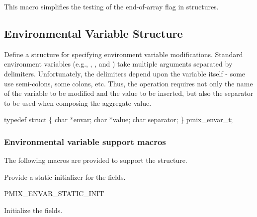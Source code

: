 This macro simplifies the testing of the end-of-array flag in  structures.

\subsection{Environmental Variable Structure}

Define a structure for specifying environment variable modifications.
Standard environment variables (e.g., , , and )
take multiple arguments separated by delimiters. Unfortunately, the delimiters
depend upon the variable itself - some use semi-colons, some colons, etc. Thus,
the operation requires not only the name of the variable to be modified and
the value to be inserted, but also the separator to be used when composing
the aggregate value.

\cspecificstart
\begin{codepar}
typedef struct \{
    char *envar;
    char *value;
    char separator;
\} pmix_envar_t;
\end{codepar}
\cspecificend

\subsubsection{Environmental variable support macros}

The following macros are provided to support the  structure.


Provide a static initializer for the  fields.

\cspecificstart
\begin{codepar}
PMIX_ENVAR_STATIC_INIT
\end{codepar}
\cspecificend



Initialize the  fields.


\begin{arglist}
\end{arglist}

